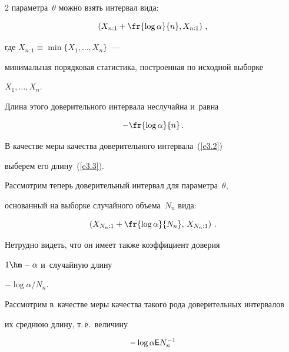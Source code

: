 \begin{multicols}{2}
параметра~$\theta$ можно взять интервал вида:


\begin{equation}


\left(X_{n:1} + \fr{\log\alpha}{n}, X_{n:1}\right)\,,


\label{e3.2}


\end{equation}


где $X_{n:1} \equiv \min\{X_1,\ldots,X_n\}$~--- 


минимальная порядковая статистика, построенная по исходной выборке


$X_1,\ldots,X_n$.


Длина этого доверительного интервала неслучайна и~равна


\begin{equation}


-\fr{\log\alpha}{n}\,.


\label{e3.3}


\end{equation}


В качестве меры качества доверительного интервала~(\ref{e3.2}) 


выберем его длину~(\ref{e3.3}).





Рассмотрим теперь доверительный интервал для параметра~$\theta$, 


основанный на выборке случайного объема~$N_n$ вида:


\begin{equation}


\left(X_{N_n:1} + \fr{\log\alpha}{N_n},\, X_{N_n:1}\right)\,.


\label{e3.4}


\end{equation}


Нетрудно видеть, что он имеет также коэффициент доверия 


$1\hm - \alpha$ и~случайную длину


$-{\log\alpha}/{N_n}$.





Рассмотрим в~качестве меры качества такого рода доверительных интервалов 


их среднюю длину, т.\,е.\ величину


\begin{equation}


-\log\alpha {\sf E} N_n^{-1}



\end{equation}
\end{multicols}
